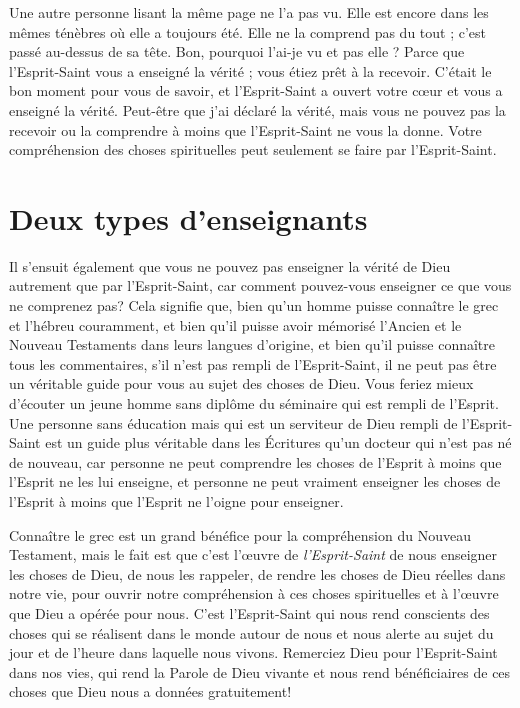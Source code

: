 Une autre personne lisant la même page ne l'a pas vu.
 Elle est encore dans les mêmes ténèbres où elle a toujours été.
 Elle ne la comprend pas du tout ; c'est passé au-dessus de sa tête.
 \og Bon, pourquoi l'ai-je vu et pas elle ? \fg{}
 Parce que l'Esprit-Saint vous a enseigné la vérité ;
 vous étiez prêt à la recevoir.
 C'était le bon moment pour vous de savoir, et l'Esprit-Saint
 a ouvert votre cœur et vous a enseigné la vérité.
 Peut-être que j'ai déclaré la vérité, mais vous ne pouvez pas la recevoir
 ou la comprendre à moins que l'Esprit-Saint ne vous la donne.
 Votre compréhension des choses spirituelles peut seulement se faire
 par l'Esprit-Saint.


\section{Deux types d'enseignants}

Il s'ensuit également que vous ne pouvez pas enseigner
 la vérité de Dieu autrement que par l'Esprit-Saint,
 car comment pouvez-vous enseigner ce que vous ne comprenez pas?
 Cela signifie que, bien qu'un homme puisse connaître le grec et l'hébreu
 couramment, et bien qu'il puisse avoir mémorisé l'Ancien
 et le Nouveau Testaments dans leurs langues d'origine,
 et bien qu'il puisse connaître tous les commentaires,
 s'il n'est pas rempli de l'Esprit-Saint,
 il ne peut pas être un véritable guide pour vous
 au sujet des choses de Dieu.
 Vous feriez mieux d'écouter un jeune homme sans diplôme
 du séminaire qui est rempli de l'Esprit.
 Une personne sans éducation mais qui est un serviteur de Dieu
 rempli de l'Esprit-Saint est un guide plus véritable
 dans les Écritures qu'un docteur qui n'est pas né de nouveau,
 car personne ne peut comprendre les choses de l'Esprit
 à moins que l'Esprit ne les lui enseigne,
 et personne ne peut vraiment enseigner les choses de l'Esprit
 à moins que l'Esprit ne l'oigne pour enseigner.

Connaître le grec est un grand bénéfice pour la compréhension
 du Nouveau Testament, mais le fait est que c'est l'œuvre
 de \emph{l'Esprit-Saint} de nous enseigner les choses de Dieu,
 de nous les rappeler, de rendre les choses de Dieu réelles
 dans notre vie, pour ouvrir notre compréhension
 à ces choses spirituelles et à l'œuvre que Dieu a opérée pour nous.
 C'est l'Esprit-Saint qui nous rend conscients des choses
 qui se réalisent dans le monde autour de nous et nous alerte
 au sujet du jour et de l'heure dans laquelle nous vivons.
 Remerciez Dieu pour l'Esprit-Saint dans nos vies,
 qui rend la Parole de Dieu vivante et nous rend bénéficiaires
 de ces choses que Dieu nous a données gratuitement!
\closechapter

